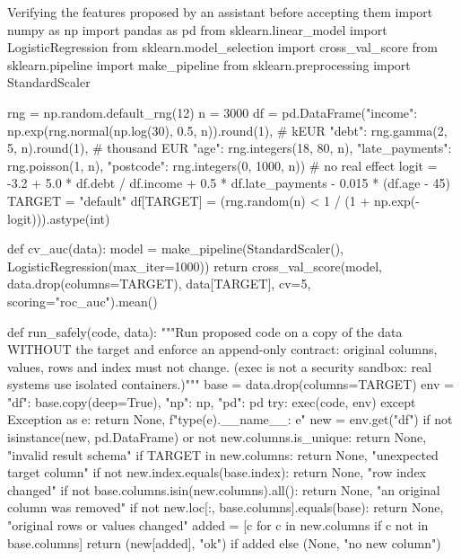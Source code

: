 \begin{pylisting}[label={lst:assistant}]{Verifying the features proposed by an assistant before accepting them}
import numpy as np
import pandas as pd
from sklearn.linear_model import LogisticRegression
from sklearn.model_selection import cross_val_score
from sklearn.pipeline import make_pipeline
from sklearn.preprocessing import StandardScaler

rng = np.random.default_rng(12)
n = 3000
df = pd.DataFrame({"income": np.exp(rng.normal(np.log(30), 0.5, n)).round(1),  # kEUR
                   "debt": rng.gamma(2, 5, n).round(1),                # thousand EUR
                   "age": rng.integers(18, 80, n),
                   "late_payments": rng.poisson(1, n),
                   "postcode": rng.integers(0, 1000, n)})              # no real effect
logit = -3.2 + 5.0 * df.debt / df.income + 0.5 * df.late_payments - 0.015 * (df.age - 45)
TARGET = "default"
df[TARGET] = (rng.random(n) < 1 / (1 + np.exp(-logit))).astype(int)

def cv_auc(data):
    model = make_pipeline(StandardScaler(), LogisticRegression(max_iter=1000))
    return cross_val_score(model, data.drop(columns=TARGET), data[TARGET], cv=5,
                           scoring="roc_auc").mean()

def run_safely(code, data):
    """Run proposed code on a copy of the data WITHOUT the target and enforce an
    append-only contract: original columns, values, rows and index must not change.
    (exec is not a security sandbox: real systems use isolated containers.)"""
    base = data.drop(columns=TARGET)
    env = {"df": base.copy(deep=True), "np": np, "pd": pd}
    try:
        exec(code, env)
    except Exception as e:
        return None, f"{type(e).__name__}: {e}"
    new = env.get("df")
    if not isinstance(new, pd.DataFrame) or not new.columns.is_unique:
        return None, "invalid result schema"
    if TARGET in new.columns:
        return None, "unexpected target column"
    if not new.index.equals(base.index):
        return None, "row index changed"
    if not base.columns.isin(new.columns).all():
        return None, "an original column was removed"
    if not new.loc[:, base.columns].equals(base):
        return None, "original rows or values changed"
    added = [c for c in new.columns if c not in base.columns]
    return (new[added], "ok") if added else (None, "no new column")


\end{pylisting}
